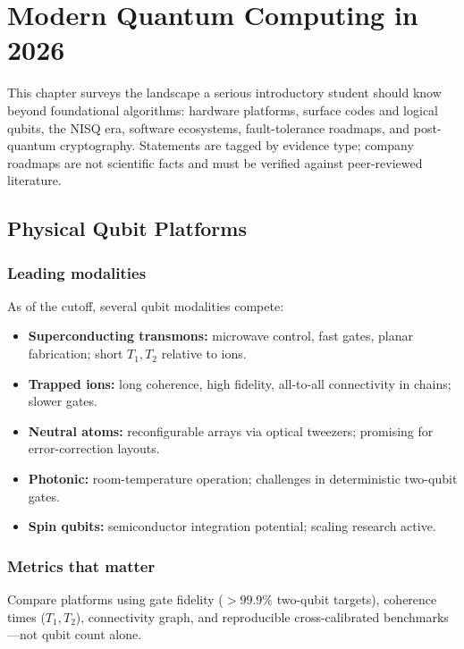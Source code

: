 \chapter{Modern Quantum Computing in 2026}
\label{ch:modern}

This chapter surveys the landscape a serious introductory student should know beyond foundational algorithms: hardware platforms, surface codes and logical qubits, the NISQ era, software ecosystems, fault-tolerance roadmaps, and post-quantum cryptography. Statements are tagged by evidence type; company roadmaps are not scientific facts and must be verified against peer-reviewed literature.

\section{Physical Qubit Platforms}
\label{sec:hardware}

\subsection{Leading modalities}

As of the \cutoff{} cutoff, several qubit modalities compete:
\begin{itemize}[noitemsep]
\item \textbf{Superconducting transmons:} microwave control, fast gates, planar fabrication; short $T_1,T_2$ relative to ions.
\item \textbf{Trapped ions:} long coherence, high fidelity, all-to-all connectivity in chains; slower gates.
\item \textbf{Neutral atoms:} reconfigurable arrays via optical tweezers; promising for error-correction layouts.
\item \textbf{Photonic:} room-temperature operation; challenges in deterministic two-qubit gates.
\item \textbf{Spin qubits:} semiconductor integration potential; scaling research active.
\end{itemize}

\subsection{Metrics that matter}

Compare platforms using gate fidelity ($>99.9\%$ two-qubit targets), coherence times ($T_1,T_2$), connectivity graph, and reproducible cross-calibrated benchmarks---not qubit count alone.

